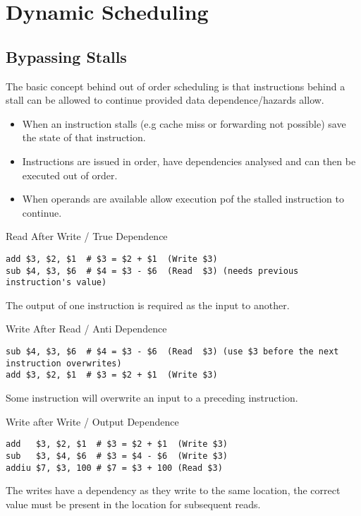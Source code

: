 \chapter{Dynamic Scheduling}
\section{Bypassing Stalls}
The basic concept behind out of order scheduling is that instructions behind a stall can be allowed to continue provided data dependence/hazards allow.
\begin{itemize}
	\item When an instruction stalls (e.g cache miss or forwarding not possible) save the state of that instruction.
	\item Instructions are issued in order, have dependencies analysed and can then be executed out of order.
	\item When operands are available allow execution pof the stalled instruction to continue.
\end{itemize}
\begin{definitionbox}{Read After Write / True Dependence}
	\begin{verbatim}
add $3, $2, $1  # $3 = $2 + $1  (Write $3)
sub $4, $3, $6  # $4 = $3 - $6  (Read  $3) (needs previous instruction's value)
    \end{verbatim}
	The output of one instruction is required as the input to another.
\end{definitionbox}

\begin{definitionbox}{Write After Read / Anti Dependence}
	\begin{verbatim}
sub $4, $3, $6  # $4 = $3 - $6  (Read  $3) (use $3 before the next instruction overwrites)
add $3, $2, $1  # $3 = $2 + $1  (Write $3)
    \end{verbatim}
	Some instruction will overwrite an input to a preceding instruction.
\end{definitionbox}

\begin{definitionbox}{Write after Write / Output Dependence}
	\begin{verbatim}
add   $3, $2, $1  # $3 = $2 + $1  (Write $3)
sub   $3, $4, $6  # $3 = $4 - $6  (Write $3)
addiu $7, $3, 100 # $7 = $3 + 100 (Read $3)
    \end{verbatim}
	The writes have a dependency as they write to the same location, the correct value must be present in the location for subsequent reads.
\end{definitionbox}

